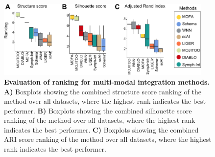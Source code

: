 \begin{figure}[!ht]
	\centering
	\includegraphics[width=0.95\textwidth]{ranking/fig}
	\vspace{0.1cm}
	\caption[Evaluation of ranking for multi-modal integration methods.]{\textbf{Evaluation of ranking for multi-modal integration methods.} \textbf{A)} Boxplots showing the combined structure score ranking of the method over all datasets, where the highest rank indicates the best performer. \textbf{B)} Boxplots showing the combined silhouette score ranking of the method over all datasets, where the highest rank indicates the best performer. \textbf{C)} Boxplots showing the combined ARI score ranking of the method over all datasets, where the highest rank indicates the best performer.}
	\label{fig:ranking}
\end{figure}

